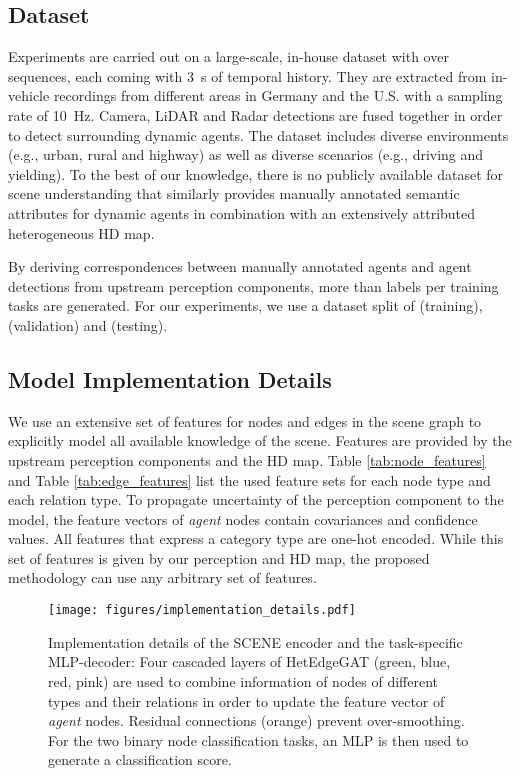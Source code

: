 \documentclass[letterpaper, 10 pt, journal, twoside]{IEEEtran}
\begin{document}
\subsection{Dataset}
Experiments are carried out on a large-scale, in-house dataset with over  sequences, each coming with \SI{3}{s} of temporal history.
They are extracted from in-vehicle recordings from different areas in Germany and the U.S. with a sampling rate of \SI{10}{Hz}.
Camera, LiDAR and Radar detections are fused together in order to detect surrounding dynamic agents.
The dataset includes diverse environments (e.g., urban, rural and highway) as well as diverse scenarios (e.g., driving and yielding).
To the best of our knowledge, there is no publicly available dataset for scene understanding that similarly provides manually annotated semantic attributes for dynamic agents in combination with an extensively attributed heterogeneous HD map.

By deriving correspondences between manually annotated agents and agent detections from upstream perception components, more than  labels per training tasks are generated.
For our experiments, we use a dataset split of  (training),  (validation) and  (testing).

\subsection{Model Implementation Details}
We use an extensive set of features for nodes and edges in the scene graph to explicitly model all available knowledge of the scene.
Features are provided by the upstream perception components and the HD map.
Table \ref{tab:node_features} and Table \ref{tab:edge_features} list the used feature sets for each node type and each relation type.
To propagate uncertainty of the perception component to the model, the feature vectors of \textit{agent} nodes contain covariances and confidence values.
All features that express a category type are one-hot encoded.
While this set of features is given by our perception and HD map, the proposed methodology can use any arbitrary set of features.

\begin{figure*}[thpb]
	\centering
	\texttt{[image: figures/implementation\_details.pdf]}
	\vspace{-0.6cm}
	\caption{Implementation details of the SCENE encoder and the task-specific MLP-decoder: Four cascaded layers of HetEdgeGAT (green, blue, red, pink) are used to combine information of nodes of different types and their relations in order to update the feature vector of \textit{agent} nodes. Residual connections (orange) prevent over-smoothing. For the two binary node classification tasks, an MLP is then used to generate a classification score.}
	\label{fig:implementation_details}
	\vspace{-0.1cm}
\end{figure*}
\end{document}

